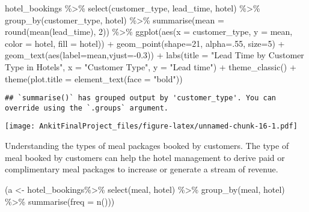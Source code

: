 \documentclass[
]{article}
\newenvironment{Shaded}{\begin{snugshade}}{\end{snugshade}}
\newcommand{\AttributeTok}[1]{\textcolor[rgb]{0.77,0.63,0.00}{#1}}
\newcommand{\DecValTok}[1]{\textcolor[rgb]{0.00,0.00,0.81}{#1}}
\newcommand{\FloatTok}[1]{\textcolor[rgb]{0.00,0.00,0.81}{#1}}
\newcommand{\FunctionTok}[1]{\textcolor[rgb]{0.00,0.00,0.00}{#1}}
\newcommand{\NormalTok}[1]{#1}
\newcommand{\OtherTok}[1]{\textcolor[rgb]{0.56,0.35,0.01}{#1}}
\newcommand{\SpecialCharTok}[1]{\textcolor[rgb]{0.00,0.00,0.00}{#1}}
\newcommand{\StringTok}[1]{\textcolor[rgb]{0.31,0.60,0.02}{#1}}
\begin{document}
\begin{Shaded}
\begin{Highlighting}[]
\NormalTok{hotel\_bookings  }\SpecialCharTok{\%\textgreater{}\%} \FunctionTok{select}\NormalTok{(customer\_type, lead\_time, hotel) }\SpecialCharTok{\%\textgreater{}\%} \FunctionTok{group\_by}\NormalTok{(customer\_type, hotel) }\SpecialCharTok{\%\textgreater{}\%} \FunctionTok{summarise}\NormalTok{(}\AttributeTok{mean =} \FunctionTok{round}\NormalTok{(}\FunctionTok{mean}\NormalTok{(lead\_time), }\DecValTok{2}\NormalTok{)) }\SpecialCharTok{\%\textgreater{}\%} \FunctionTok{ggplot}\NormalTok{(}\FunctionTok{aes}\NormalTok{(}\AttributeTok{x =}\NormalTok{ customer\_type, }\AttributeTok{y =}\NormalTok{ mean, }\AttributeTok{color =}\NormalTok{ hotel, }\AttributeTok{fill =}\NormalTok{ hotel)) }\SpecialCharTok{+} 
  \FunctionTok{geom\_point}\NormalTok{(}\AttributeTok{shape=}\DecValTok{21}\NormalTok{, }\AttributeTok{alpha=}\NormalTok{.}\DecValTok{55}\NormalTok{, }\AttributeTok{size=}\DecValTok{5}\NormalTok{) }\SpecialCharTok{+} 
  \FunctionTok{geom\_text}\NormalTok{(}\FunctionTok{aes}\NormalTok{(}\AttributeTok{label=}\NormalTok{mean,}\AttributeTok{vjust=}\SpecialCharTok{{-}}\FloatTok{0.3}\NormalTok{)) }\SpecialCharTok{+}
  \FunctionTok{labs}\NormalTok{(}\AttributeTok{title =} \StringTok{"Lead Time by Customer Type in Hotels"}\NormalTok{, }\AttributeTok{x =} \StringTok{"Customer Type"}\NormalTok{, }\AttributeTok{y =} \StringTok{"Lead time"}\NormalTok{) }\SpecialCharTok{+} \FunctionTok{theme\_classic}\NormalTok{() }\SpecialCharTok{+}
  \FunctionTok{theme}\NormalTok{(}\AttributeTok{plot.title =} \FunctionTok{element\_text}\NormalTok{(}\AttributeTok{face =} \StringTok{"bold"}\NormalTok{))}
\end{Highlighting}
\end{Shaded}

\begin{verbatim}
## `summarise()` has grouped output by 'customer_type'. You can override using the `.groups` argument.
\end{verbatim}

\texttt{[image: AnkitFinalProject\_files/figure-latex/unnamed-chunk-16-1.pdf]}

Understanding the types of meal packages booked by customers. The type
of meal booked by customers can help the hotel management to derive paid
or complimentary meal packages to increase or generate a stream of
revenue.

\begin{Shaded}
\begin{Highlighting}[]
\NormalTok{(a }\OtherTok{\textless{}{-}}\NormalTok{ hotel\_bookings}\SpecialCharTok{\%\textgreater{}\%} \FunctionTok{select}\NormalTok{(meal, hotel) }\SpecialCharTok{\%\textgreater{}\%}  \FunctionTok{group\_by}\NormalTok{(meal, hotel) }\SpecialCharTok{\%\textgreater{}\%}  \FunctionTok{summarise}\NormalTok{(}\AttributeTok{freq =} \FunctionTok{n}\NormalTok{()))}
\end{Highlighting}
\end{Shaded}
\end{document}
